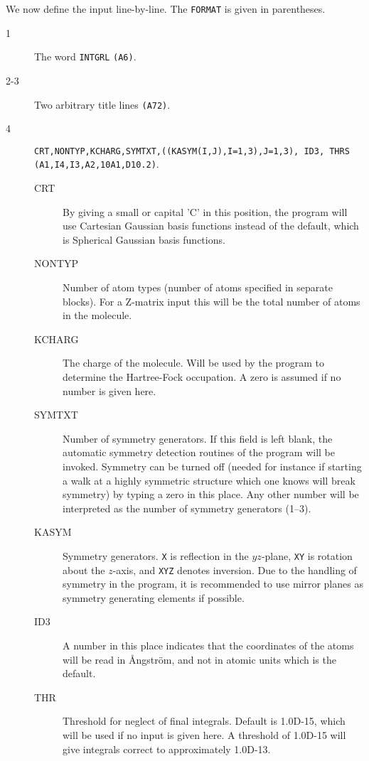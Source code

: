 We now define the input line-by-line.  The {\tt FORMAT} is given
in parentheses.
\begin{description}
\item[1] The word \verb|INTGRL| {\tt (A6)}.
\item[2-3] Two arbitrary title lines {\tt (A72)}.
\item[4] \verb|CRT,NONTYP,KCHARG,SYMTXT,((KASYM(I,J),I=1,3),J=1,3), ID3, THRS|
{\tt (A1,I4,I3,A2,10A1,D10.2)}.
\begin{description}
\item[CRT] By giving a small or capital 'C' in this
position, the program will use Cartesian Gaussian basis
functions instead of
the default, which is Spherical Gaussian basis
functions.
\item[NONTYP] Number of atom types (number of atoms specified
in separate blocks). For a Z-matrix input this will be the total
number of atoms in the molecule.
\item[KCHARG] The charge of the molecule. Will be used  by 
the program to determine the Hartree-Fock occupation. A zero is
assumed if no number is given here.
\item[SYMTXT] Number of symmetry generators. If this field is 
left blank, the automatic symmetry detection
routines of the program will be 
invoked. Symmetry can be turned off (needed for instance if starting a
walk at a highly symmetric structure which one knows will break
symmetry) by typing a zero in this place. Any other number will be
interpreted as the number of symmetry generators (1--3).
\item[KASYM] Symmetry generators.  {\tt X}
is reflection 
in the \mbox{$yz$-plane}, {\tt XY} is rotation about
the \mbox{$z$-axis}, 
and {\tt XYZ} denotes inversion. Due to the handling
of symmetry in 
the program, it is recommended to use mirror planes as symmetry
generating elements if possible.

\item[ID3] A number in this place indicates that the
coordinates of the atoms will be read in \AA ngstr\"{o}m, and not in 
atomic units which is the default.
\item[THR] Threshold for neglect of final integrals. Default
is 1.0D-15, which will be used if no input is given here. A threshold
of 1.0D-15 will give integrals correct to approximately 1.0D-13.
\end{description}
\end{description}

